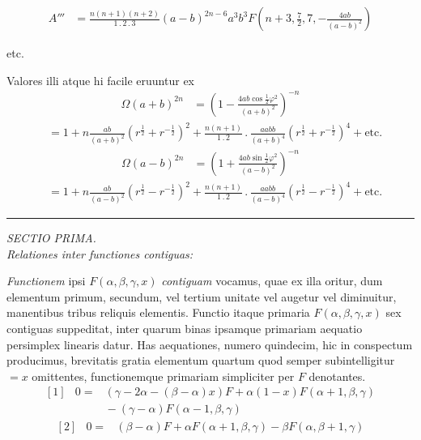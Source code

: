 \[
\begin{array}{rl}
A'''&=\frac{n(n+1)(n+2)}{1\mathbin{.}2\mathbin{.}3}(a-b)^{2n-6}a^3b^3F(n+3,\frac72,7,-\frac{4ab}{(a-b)^2})
\end{array}
\]
\begin{center}etc.\end{center}
Valores illi atque hi facile eruuntur ex
\[
\begin{array}{rl}
\Omega(a+b)^{2n}&=(1-\frac{4ab\cos\frac12\varphi^2}{(a+b)^2})^{-n}
\end{array}
\]
\[
\begin{array}{rl}
&=1+n\frac{ab}{(a+b)^2}(r^{\frac12}+r^{-\frac12})^2+\frac{n(n+1)}{1\mathbin{.}2}\mathbin{.}\frac{aabb}{(a+b)^4}(r^{\frac12}+r^{-\frac12})^4+\mathrm{etc.}
\end{array}
\]
\[
\begin{array}{rl}
\Omega(a-b)^{2n}&=(1+\frac{4ab\sin\frac12\varphi^2}{(a-b)^2})^{-n}
\end{array}
\]
\[
\begin{array}{rl}
&=1+n\frac{ab}{(a-b)^2}(r^{\frac12}-r^{-\frac12})^2+\frac{n(n+1)}{1\mathbin{.}2}\mathbin{.}\frac{aabb}{(a-b)^4}(r^{\frac12}-r^{-\frac12})^4+\mathrm{etc.}
\end{array}
\]
\begin{center}\rule{.23\linewidth}{.4pt}\end{center}
\begin{center}\textit{SECTIO PRIMA.}\\[4pt]
\textit{Relationes inter functiones contiguas:}\end{center}
\textit{Functionem} ipsi $F(\alpha,\beta,\gamma,x)$ \textit{contiguam} vocamus, quae ex illa oritur, dum
elementum primum, secundum, vel tertium unitate vel augetur vel diminuitur,
manentibus tribus reliquis elementis. Functio itaque primaria $F(\alpha,\beta,\gamma,x)$ sex
contiguas suppeditat, inter quarum binas ipsamque primariam aequatio persimplex linearis datur. Has aequationes, numero quindecim, hic in conspectum
producimus, brevitatis gratia elementum quartum quod semper subintelligitur $=x$
omittentes, functionemque primariam simpliciter per $F$ denotantes.
\[
\begin{array}{rcl}
{[1]}&0=&(\gamma-2\alpha-(\beta-\alpha)x)F+\alpha(1-x)F(\alpha+1,\beta,\gamma)\\
&&{}-(\gamma-\alpha)F(\alpha-1,\beta,\gamma)
\end{array}
\]
\[
\begin{array}{rcl}
{[2]}&0=&(\beta-\alpha)F+\alpha F(\alpha+1,\beta,\gamma)-\beta F(\alpha,\beta+1,\gamma)
\end{array}
\]
